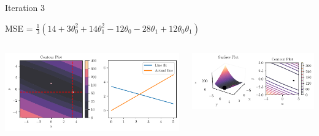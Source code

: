 \documentclass{beamer}
\begin{document}
\begin{frame}{Iteration 3}

MSE = $\frac{1}{3}(14+3\theta_{0}^{2}+14\theta_{1}^{2}-12\theta_{0}-28\theta_{1}+12\theta_{0}\theta_{1})$\\

\begin{columns}
\begin{column}{0.6\textwidth}
\begin{adjustbox}{max totalsize={\textwidth},center}
\includegraphics[width=\textwidth]{../../maths/assets/mathematical-ml/figures/gradient-descent-3.pdf}
\end{adjustbox}

\end{column}
\begin{column}{0.5\textwidth}
\begin{adjustbox}{max totalsize={\textwidth},center}
\includegraphics[width=\textwidth]{../../maths/assets/mathematical-ml/figures/contour-linreg-3.pdf}
\end{adjustbox}
\end{column}
\end{columns}


\end{frame}


%
\end{document}
